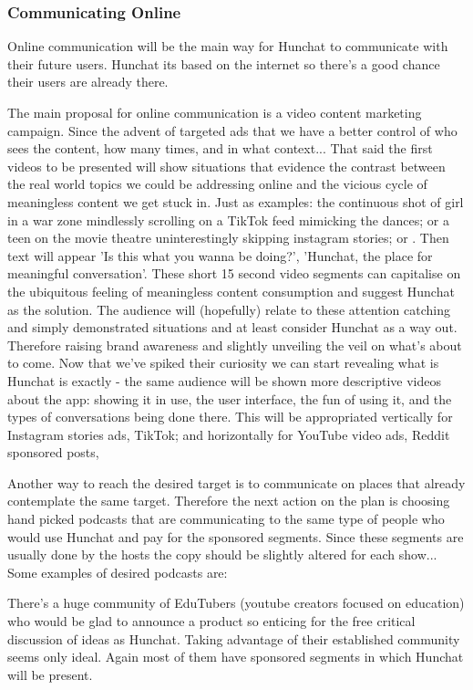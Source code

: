 \documentclass[12pt]{article}
\begin{document}
	\subsubsection{Communicating Online}
	
	Online communication will be the main way for Hunchat to communicate with their future users. Hunchat its based on the internet so there's a good chance their users are already there.
	
	The main proposal for online communication is a video content marketing campaign. Since the advent of targeted ads that we have a better control of who sees the content, how many times, and in what context... That said the first videos to be presented will show situations that evidence the contrast between the real world topics we could be addressing online and the vicious cycle of meaningless content we get stuck in. Just as examples: the continuous shot of girl in a war zone mindlessly scrolling on a TikTok feed mimicking the dances; or a teen on the movie theatre uninterestingly skipping instagram stories; or  . Then text will appear 'Is this what you wanna be doing?', 'Hunchat, the place for meaningful conversation'. These short 15 second video segments can capitalise on the ubiquitous feeling of meaningless content consumption and suggest Hunchat as the solution. The audience will (hopefully) relate to these attention catching and simply demonstrated situations and at least consider Hunchat as a way out. Therefore raising brand awareness and slightly unveiling the veil on what's about to come. Now that we've spiked their curiosity we can start revealing what is Hunchat is exactly - the same audience will be shown more descriptive videos about the app: showing it in use, the user interface, the fun of using it, and the types of conversations being done there. This will be appropriated vertically for Instagram stories ads, TikTok; and horizontally for YouTube video ads, Reddit sponsored posts,
	
	Another way to reach the desired target is to communicate on places that already contemplate the same target. Therefore the next action on the plan is choosing hand picked podcasts that are communicating to the same type of people who would use Hunchat and pay for the sponsored segments. Since these segments are usually done by the hosts the copy should be slightly altered for each show... Some examples of desired podcasts are: 
	
	There's a huge community of EduTubers (youtube creators focused on education) who would be glad to announce a product so enticing for the free critical discussion of ideas as Hunchat. Taking advantage of their established community seems only ideal. Again most of them have sponsored segments in which Hunchat will be present.
	
\end{document}
